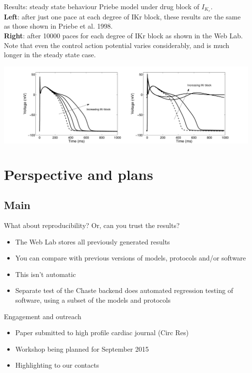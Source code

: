 \documentclass[t,xcolor={usenames,dvipsnames}]{beamer}
\begin{document}
\begin{frame}{Results: steady state behaviour}
Priebe model under drug block of $I_{K_r}$.\\
\textbf{Left}: after just one pace at each degree of IKr block, these results are the same as those shown in Priebe et al. 1998.\\
\textbf{Right}: after 10000 paces for each degree of IKr block as shown in the Web Lab. Note that even the control action potential varies considerably, and is much longer in the steady state case.
\begin{center}
\includegraphics[width=\textwidth]{weblab_fig6}
\end{center}
\end{frame}

\section{Perspective and plans}
\subsection*{Main}

\begin{frame}{What about reproducibility?}
Or, can you trust the results?
\begin{itemize}
\item The Web Lab stores all previously generated results
\item You can compare with previous versions of models, protocols and/or software
\item This isn't automatic
\item Separate test of the Chaste backend does automated regression testing of software, using a subset of the models and protocols
\end{itemize}
\end{frame}


\begin{frame}{Engagement and outreach}
\begin{itemize}
\item Paper submitted to high profile cardiac journal (Circ Res)
\item Workshop being planned for September 2015
\item Highlighting to our contacts
\end{itemize}
\end{frame}
\end{document}
